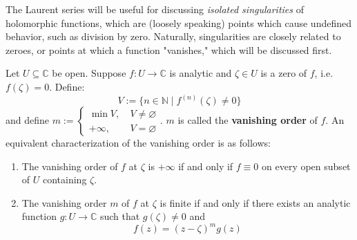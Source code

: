 The Laurent series will be useful for discussing \textit{isolated singularities} of holomorphic functions, which are (loosely speaking) points which cause undefined behavior, such as division by zero. Naturally, singularities are closely related to zeroes, or points at which a function "vanishes," which will be discussed first.

Let $U\subseteq\mathbb{C}$ be open. Suppose $f:U\to\mathbb{C}$ is analytic and $\zeta\in U$ is a zero of $f$, i.e. $f(\zeta)=0$. Define: \[V:=\{n\in\mathbb{N}\mid f^{(n)}(\zeta)\neq 0\}\] and define $m:=\begin{cases}
    \min V,\ & V\neq \varnothing\\
    +\infty,\ & V=\varnothing
\end{cases}$. $m$ is called the \textbf{vanishing order} of $f$. An equivalent characterization of the vanishing order is as follows: \begin{enumerate}
    \item[(i)] The vanishing order of $f$ at $\zeta$ is $+\infty$ if and only if $f\equiv 0$ on every open subset of $U$ containing $\zeta$.
    \item[(ii)] The vanishing order $m$ of $f$ at $\zeta$ is finite if and only if there exists an analytic function $g:U\to\mathbb{C}$ such that $g(\zeta)\neq 0$ and \[f(z) = (z-\zeta)^m g(z)\]
\end{enumerate}

